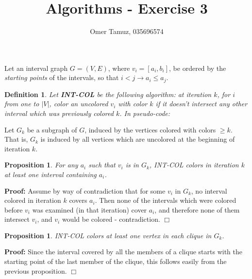 \documentclass[11pt]{article} \usepackage{amssymb}
\newtheorem{proposition}[theorem]{Proposition}
\newtheorem{definition}[theorem]{Definition}
\newenvironment{proof}{\noindent \textbf{Proof:}}{$\Box$}
\begin{document}
\title{Algorithms - Exercise 3}

 \author{Omer Tamuz, 035696574}
\maketitle
Let an interval graph $G=(V,E)$, where $v_i=[a_i,b_i]$, be ordered by the 
{\em starting points} of the intervals, so that $i<j\to a_i\leq a_j$.
\begin{definition}
Let {\bf INT-COL} be the following algorithm: at iteration $k$, for $i$
from one to $|V|$, color an uncolored $v_i$ with color $k$ if it doesn't 
intersect any
other interval which was previously colored $k$. In pseudo-code:

    \begin{algorithmic}
          \ENDIF
        \ENDFOR
      \ENDWHILE  
    \end{algorithmic}
\end{definition}


  Let $G_k$ be a subgraph of $G$, induced by the vertices colored with colors 
  $\geq k$. That is, $G_k$ is induced by all vertices which are uncolored at the
  beginning of iteration $k$.
\begin{proposition}
  For any $a_i$ such that $v_i$ is in $G_k$, INT-COL colors 
  in iteration $k$ at least one interval containing 
  $a_i$.
\end{proposition}
\begin{proof}
  Assume by way of contradiction that for some $v_i$ in $G_k$, no interval
  colored in iteration $k$ covers $a_i$. Then none of the intervals
  which were colored before $v_i$ was examined (in that iteration) 
  cover $a_i$, and
  therefore none of them intersect $v_i$, and $v_i$ would be colored -
  contradiction.
\end{proof}

\begin{proposition}
  INT-COL colors at least one vertex in each clique in $G_k$.
\end{proposition}
\begin{proof}
  Since the interval covered by all the members of a clique starts with the 
  starting
  point of the last member of the clique, this follows easily from the 
  previous proposition.
\end{proof}
\end{document}
